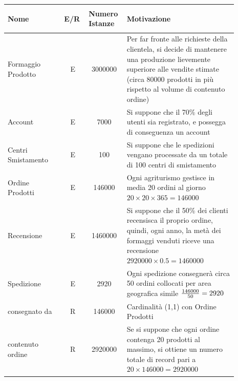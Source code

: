 \documentclass[12pt,a4paper]{article}
\begin{document}
\begin{center}\setlength{\extrarowheight}{1.5pt}\begin{longtable}{|p{0.23\linewidth}|p{0.1\linewidth}|p{0.11\linewidth}|p{0.45\linewidth}|}
\hline \textbf{Nome}   & \begin{center}\vspace{-15pt}\textbf{E/R}\end{center} & \textbf{Numero Istanze} & \textbf{Motivazione}\\ 

    
\hline
 Formaggio Prodotto
 & 
\multicolumn{1}{|c|}{E}
 & 
\multicolumn{1}{|c|}{3000000}
 & 
Per far fronte alle richieste della clientela, si decide di mantenere una produzione lievemente superiore alle vendite stimate (circa 80000 prodotti in più rispetto al volume di contenuto ordine)
\\

\hline
Account
 & 
\multicolumn{1}{|c|}{E}
 & 
\multicolumn{1}{|c|}{7000}
 & 
Si suppone che il 70\% degli utenti sia registrato, e possegga di conseguenza un account
\\

\hline
Centri Smistamento
 & 
\multicolumn{1}{|c|}{E}
 & 
\multicolumn{1}{|c|}{100}
 & 
Si suppone che le spedizioni vengano processate da un totale di 100 centri di smistamento
\\

\hline
Ordine Prodotti
 & 
\multicolumn{1}{|c|}{E}
 & 
\multicolumn{1}{|c|}{146000}
 & 
 Ogni agriturismo gestisce in media 20 ordini al giorno $20\times 20\times 365 = 146000$
\\

\hline
Recensione
 & 
\multicolumn{1}{|c|}{E}
 & 
\multicolumn{1}{|c|}{1460000}
 & 
Si suppone che il 50\% dei clienti recensisca il proprio ordine, quindi, ogni anno, la metà dei formaggi venduti riceve una recensione $2920000\times0.5=1460000$
\\

\hline
Spedizione
 & 
\multicolumn{1}{|c|}{E}
 & 
\multicolumn{1}{|c|}{2920}
 & 
Ogni spedizione consegnerà circa 50 ordini collocati per area geografica simile ${146000\over 50}=2920$
\\

\hline
consegnato da
 & 
\multicolumn{1}{|c|}{R}
 & 
\multicolumn{1}{|c|}{146000}
 & 
Cardinalità (1,1) con Ordine Prodotti
\\

\hline
contenuto ordine
 & 
\multicolumn{1}{|c|}{R}
 & 
\multicolumn{1}{|c|}{2920000}
 & 
 Se si suppone che ogni ordine contenga 20 prodotti al massimo, si ottiene un numero totale di record pari a $20\times146000=2920000$
\\


\end{longtable}
\end{center}
\end{document}
